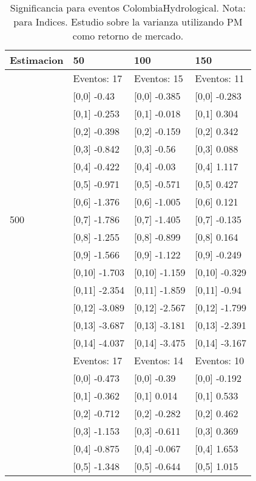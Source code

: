 \begin{table}

\caption{Significancia para eventos ColombiaHydrological. Nota: para Indices. Estudio sobre la varianza utilizando PM como retorno de mercado.}
\centering
\begin{tabular}[t]{llll}
\toprule
Estimacion & 50 & 100 & 150\\
\midrule
 & Eventos:  17 & Eventos:  15 & Eventos:  11\\
 & {}[0,0] -0.43 & {}[0,0] -0.385 & {}[0,0] -0.283\\
 & {}[0,1] -0.253 & {}[0,1] -0.018 & {}[0,1] 0.304\\
 & {}[0,2] -0.398 & {}[0,2] -0.159 & {}[0,2] 0.342\\
 & {}[0,3] -0.842 & {}[0,3] -0.56 & {}[0,3] 0.088\\
\addlinespace
 & {}[0,4] -0.422 & {}[0,4] -0.03 & {}[0,4] 1.117\\
 & {}[0,5] -0.971 & {}[0,5] -0.571 & {}[0,5] 0.427\\
 & {}[0,6] -1.376 & {}[0,6] -1.005 & {}[0,6] 0.121\\
500 & {}[0,7] -1.786 & {}[0,7] -1.405 & {}[0,7] -0.135\\
 & {}[0,8] -1.255 & {}[0,8] -0.899 & {}[0,8] 0.164\\
\addlinespace
 & {}[0,9] -1.566 & {}[0,9] -1.122 & {}[0,9] -0.249\\
 & {}[0,10] -1.703 & {}[0,10] -1.159 & {}[0,10] -0.329\\
 & {}[0,11] -2.354 & {}[0,11] -1.859 & {}[0,11] -0.94\\
 & {}[0,12] -3.089 & {}[0,12] -2.567 & {}[0,12] -1.799\\
 & {}[0,13] -3.687 & {}[0,13] -3.181 & {}[0,13] -2.391\\
\addlinespace
 & {}[0,14] -4.037 & {}[0,14] -3.475 & {}[0,14] -3.167\\
 & Eventos:  17 & Eventos:  14 & Eventos:  10\\
 & {}[0,0] -0.473 & {}[0,0] -0.39 & {}[0,0] -0.192\\
 & {}[0,1] -0.362 & {}[0,1] 0.014 & {}[0,1] 0.533\\
 & {}[0,2] -0.712 & {}[0,2] -0.282 & {}[0,2] 0.462\\
\addlinespace
 & {}[0,3] -1.153 & {}[0,3] -0.611 & {}[0,3] 0.369\\
 & {}[0,4] -0.875 & {}[0,4] -0.067 & {}[0,4] 1.653\\
 & {}[0,5] -1.348 & {}[0,5] -0.644 & {}[0,5] 1.015\\

\end{tabular}
\end{table}
